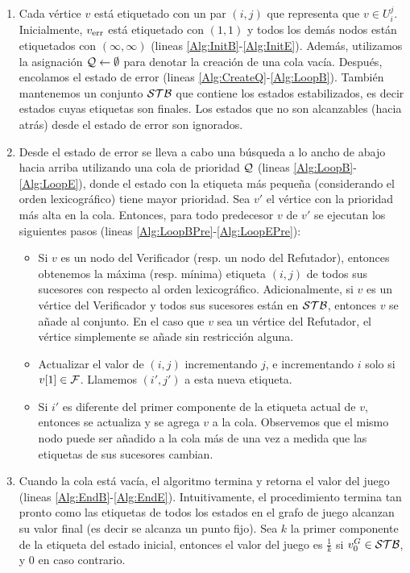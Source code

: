 \begin{enumerate}
  \item Cada vértice $v$ está etiquetado con un par $(i, j)$ que representa que $v \in U_{i}^{j}$. Inicialmente, $\ErrorSt$ está etiquetado con $(1, 1)$ y todos los demás nodos están etiquetados con $(\infty, \infty)$ (lineas \ref{Alg:InitB}-\ref{Alg:InitE}). 
  Además, utilizamos la asignación $\Q \gets \emptyset$ para denotar la creación de una cola vacía. 
  Después, encolamos el estado de error (lineas \ref{Alg:CreateQ}-\ref{Alg:LoopB}). También mantenemos un conjunto $\STB$ que contiene los estados estabilizados, es decir estados cuyas etiquetas son finales. Los estados que no son alcanzables (hacia atrás) desde el estado de error son ignorados.
  \item Desde el estado de error se lleva a cabo una búsqueda a lo ancho de abajo hacia arriba utilizando una cola de prioridad $\Q$ (lineas \ref{Alg:LoopB}-\ref{Alg:LoopE}), donde el estado con la etiqueta más pequeña (considerando el orden lexicográfico) tiene mayor prioridad. 
  Sea $v'$ el vértice con la prioridad más alta en la cola. Entonces, para todo predecesor $v$ de $v'$ se ejecutan los siguientes pasos (lineas \ref{Alg:LoopBPre}-\ref{Alg:LoopEPre}):
  \begin{itemize}
    \item Si $v$ es un nodo del Verificador (resp. un nodo del Refutador), entonces obtenemos la máxima (resp. mínima) etiqueta $(i,j)$ de todos sus sucesores con respecto al orden lexicográfico. Adicionalmente, si $v$ es un vértice del Verificador y todos sus sucesores están en $\STB$, entonces $v$ se añade al conjunto. En el caso que $v$ sea un vértice del Refutador, 
    el vértice simplemente se añade sin restricción alguna. 
    \item Actualizar el valor de $(i,j)$ incrementando $j$, e incrementando $i$ solo si $\pr{1}{v} \in \Faults$. Llamemos $(i',j')$ a esta nueva etiqueta.
    \item Si $i'$ es diferente del primer componente de la etiqueta actual de $v$, entonces se actualiza y se agrega $v$ a la cola. 
    Observemos que el mismo nodo puede ser añadido a la cola más de una vez a medida que las etiquetas de sus sucesores cambian.
  \end{itemize}
  \item Cuando la cola está vacía, 
  el algoritmo termina y retorna el valor del juego (lineas \ref{Alg:EndB}-\ref{Alg:EndE}). 
  Intuitivamente, el procedimiento termina tan pronto como las etiquetas de todos los estados en el grafo de juego alcanzan su valor final (es decir se alcanza un punto fijo). 
  Sea $k$ la primer componente de la etiqueta del estado inicial, entonces el valor del juego es $\frac{1}{k}$ si 
  $\InitVertex^G \in \STB$, y $0$ en caso contrario.\\
\end{enumerate}
